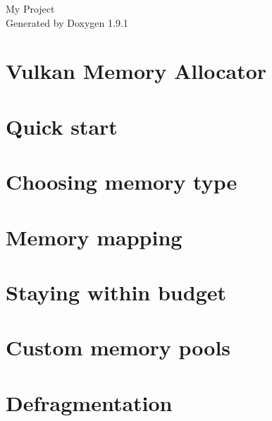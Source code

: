 \let\mypdfximage\pdfximage\def\pdfximage{\immediate\mypdfximage}\documentclass[twoside]{book}
\newcommand{\+}{\discretionary{\mbox{\scriptsize$\hookleftarrow$}}{}{}}
\newcommand{\clearemptydoublepage}{%
  \newpage{\pagestyle{empty}\cleardoublepage}%
}
\begin{document}
\raggedbottom

\hypersetup{pageanchor=false,
             bookmarksnumbered=true,
             pdfencoding=unicode
            }
\begin{titlepage}
\vspace*{7cm}
\begin{center}%
{\Large My Project }\\
\vspace*{1cm}
{\large Generated by Doxygen 1.9.1}\\
\end{center}
\end{titlepage}
\clearemptydoublepage
{}
\tableofcontents
\clearemptydoublepage
{}
\hypersetup{pageanchor=true}

\chapter{Vulkan Memory Allocator}
\label{index}\hypertarget{index}{}
\chapter{Quick start}
\label{quick_start}

\chapter{Choosing memory type}
\label{choosing_memory_type}

\chapter{Memory mapping}
\label{memory_mapping}

\chapter{Staying within budget}
\label{staying_within_budget}

\chapter{Custom memory pools}
\label{custom_memory_pools}

\chapter{Defragmentation}
\label{defragmentation}

\end{document}
